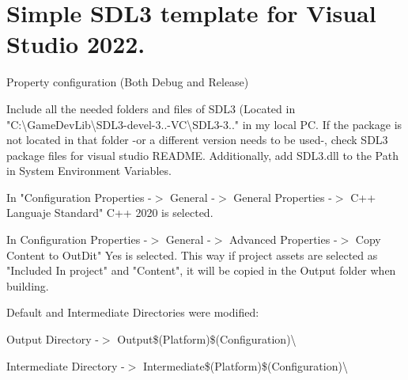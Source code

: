 \chapter{Simple SDL3 template for Visual Studio 2022.}
\hypertarget{md__r_e_a_d_m_e}{}\label{md__r_e_a_d_m_e}
\label{md__r_e_a_d_m_e_autotoc_md0}%
%


Property configuration (Both Debug and Release)


\begin{DoxyItemize}
\item Include all the needed folders and files of SDL3 (Located in "{}\+C\+:\textbackslash{}\+Game\+Dev\+Lib\textbackslash{}\+SDL3-\/devel-\/3..-\/\+VC\textbackslash{}\+SDL3-\/3.."{} in my local PC. If the package is not located in that folder -\/or a different version needs to be used-\/, check SDL3 package files for visual studio README. Additionally, add SDL3.\+dll to the Path in System Environment Variables.
\item In "{}\+Configuration Properties -\/$>$ General -\/$>$ General Properties -\/$>$ C++ Languaje Standard"{} C++ 2020 is selected.
\item In Configuration Properties -\/\texorpdfstring{$>$}{>} General -\/\texorpdfstring{$>$}{>} Advanced Properties -\/\texorpdfstring{$>$}{>} Copy Content to Out\+Dit"{} Yes is selected. This way if project assets are selected as "{}Included In project"{} and "{}Content"{}, it will be copied in the Output folder when building.
\item Default and Intermediate Directories were modified\+:
\begin{DoxyItemize}
\item Output Directory -\/\texorpdfstring{$>$}{>} Output\$(Platform)\$(Configuration)\textbackslash{}
\item Intermediate Directory -\/\texorpdfstring{$>$}{>} Intermediate\$(Platform)\$(Configuration)\textbackslash{} 
\end{DoxyItemize}
\end{DoxyItemize}